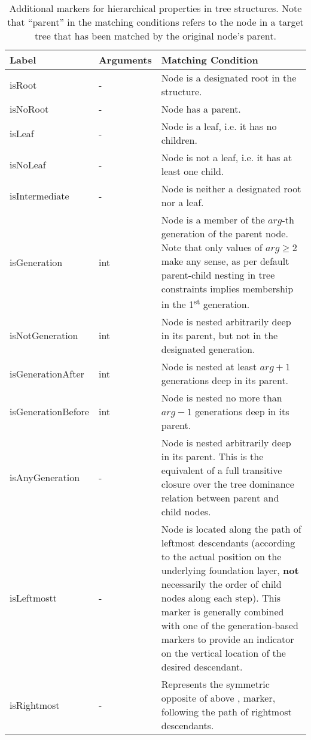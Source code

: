 \documentclass[11pt,a4paper]{article}
\begin{document}
\begin{table}[!htb]\centering
\begin{tabular}{|p{}|p{}|p{}|}
	\hline 
	\textbf{Label} & \textbf{Arguments} & \textbf{Matching Condition} \\ 
	\hline 
	\hline  
	isRoot & - & Node is a designated root in the structure. \\ 
	\hline 
	isNoRoot & - & Node has a parent. \\ 
	\hline 
	isLeaf & - & Node is a leaf, i.e. it has no children. \\  
	\hline 
	isNoLeaf & - & Node is not a leaf, i.e. it has at least one child. \\  
	\hline 
	isIntermediate & - & Node is neither a designated root nor a leaf. \\  
	\hline 
	isGeneration & int & Node is a member of the $arg$-th generation of the parent node. Note that only values of $arg \geq 2$ make any sense, as per default parent-child nesting in tree constraints implies membership in the 1\textsuperscript{st} generation. \\  
	\hline
	isNotGeneration & int & Node is nested arbitrarily deep in its parent, but not in the designated generation. \\  
	\hline  
	isGenerationAfter & int & Node is nested at least $arg+1$ generations deep in its parent. \\  
	\hline 
	isGenerationBefore & int & Node is nested no more than $arg-1$ generations deep in its parent. \\  
	\hline 
	isAnyGeneration & - & Node is nested arbitrarily deep in its parent. This is the equivalent of a full transitive closure over the tree dominance relation between parent and child nodes. \\  
	\hline 
	isLeftmostt & - & Node is located along the path of leftmost descendants (according to the actual position on the underlying foundation layer, \textbf{not} necessarily the order of child nodes along each step). This marker is generally combined with one of the generation-based markers to provide an indicator on the vertical location of the desired descendant. \\  
	\hline 
	isRightmost & - & Represents the symmetric opposite of above \query{isLeftmost}, marker, following the path of rightmost descendants. \\  
	\hline 
\end{tabular}
\caption[Hierarchical markers]{Additional markers for hierarchical properties in tree structures. Note that ``parent'' in the matching conditions refers to the node in a target tree that has been matched by the original node's parent.}
\label{tab:tree-hierarchy-markers}
\end{table}
\end{document}

